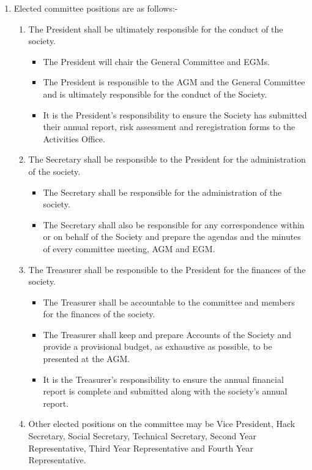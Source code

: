 \begin {enumerate}
  \item Elected committee positions are as follows:-
    \begin{enumerate}
      \item The President shall be ultimately responsible for the conduct of the society.
        \begin{itemize}
          \item The President will chair the General Committee and EGMs.
          \item The President is responsible to the AGM and the General Committee and is ultimately responsible for the conduct of the Society.
          \item It is the President’s responsibility to ensure the Society has submitted their annual report, risk assessment and reregistration forms to the Activities Office.
        \end{itemize}
      \item The Secretary shall be responsible to the President for the administration of the society.
        \begin{itemize}
          \item The Secretary shall be responsible for the administration of the society.
          \item The Secretary shall also be responsible for any correspondence within or on behalf of the Society and prepare the agendas and the minutes of every committee meeting, AGM and EGM.
        \end{itemize}
      \item The Treasurer shall be responsible to the President for the finances of the society.
        \begin{itemize}
          \item The Treasurer shall be accountable to the committee and members for the finances of the society.
          \item The Treasurer shall keep and prepare Accounts of the Society and provide a provisional budget, as exhaustive as possible, to be presented at the AGM.
          \item It is the Treasurer's responsibility to ensure the annual financial report is complete and submitted along with the society's annual report.
        \end{itemize}
      \item Other elected positions on the committee may be Vice President, Hack Secretary, Social
        Secretary, Technical Secretary, Second Year Representative,
        Third Year Representative and Fourth Year Representative.
    \end{enumerate}


\end{enumerate}
